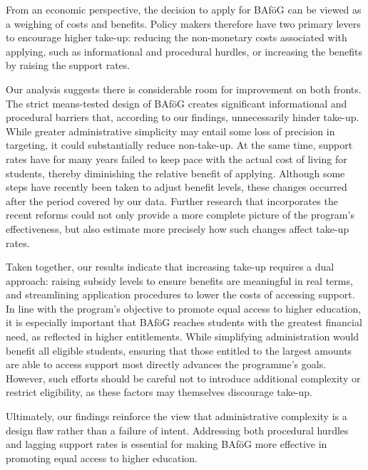 From an economic perspective, the decision to apply for BAföG can be viewed as a weighing of costs and benefits. 
Policy makers therefore have two primary levers to encourage higher take-up: reducing the non-monetary costs associated with applying, such as informational and procedural hurdles, or increasing the benefits by raising the support rates. 

Our analysis suggests there is considerable room for improvement on both fronts. 
The strict means-tested design of BAföG creates significant informational and procedural barriers that, according to our findings, unnecessarily hinder take-up.
While greater administrative simplicity may entail some loss of precision in targeting, it could substantially reduce non-take-up. 
At the same time, support rates have for many years failed to keep pace with the actual cost of living for students, thereby diminishing the relative benefit of applying. 
Although some steps have recently been taken to adjust benefit levels, these changes occurred after the period covered by our data. 
Further research that incorporates the recent reforms could not only provide a more complete picture of the program’s effectiveness, but also estimate more precisely how such changes affect take-up rates.

Taken together, our results indicate that increasing take-up requires a dual approach: raising subsidy levels to ensure benefits are meaningful in real terms, and streamlining application procedures to lower the costs of accessing support. In line with the program's objective to promote equal access to higher education, it is especially important that BAföG reaches students with the greatest financial need, as reflected in higher entitlements. While simplifying administration would benefit all eligible students, ensuring that those entitled to the largest amounts are able to access support most directly advances the programme’s goals. However, such efforts should be careful not to introduce additional complexity or restrict eligibility, as these factors may themselves discourage take-up.

 Ultimately, our findings reinforce the view that administrative complexity is a design flaw rather than a failure of intent. Addressing both procedural hurdles and lagging support rates is essential for making BAföG more effective in promoting equal access to higher education.
